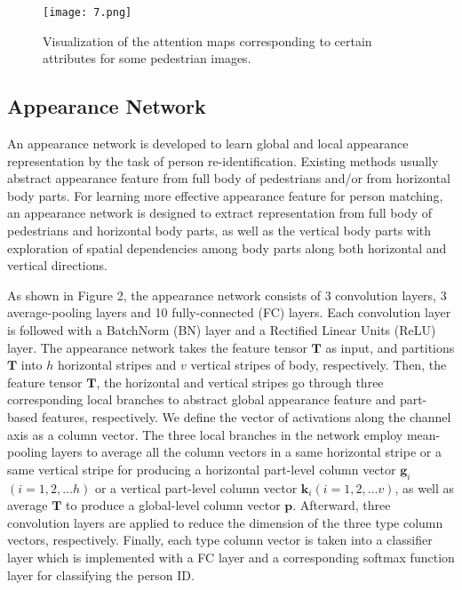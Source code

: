 \documentclass[sigconf]{acmart}
\begin{document}
\begin{figure}[htb]
	\centering
	\texttt{[image: 7.png]}
	\caption{Visualization of the attention maps corresponding to certain attributes for some pedestrian images.}
	\label{fig_overallss}
\end{figure}\subsection{Appearance Network}
An appearance network is developed to learn global and local appearance representation by the task of person re-identification.  Existing methods usually abstract appearance feature from full body of pedestrians and/or from horizontal body parts. For learning more effective appearance feature for person matching, an appearance network is designed to extract representation from full body of pedestrians and horizontal body parts, as well as the vertical body parts with exploration of spatial dependencies among body parts along both horizontal and vertical directions.

As shown in Figure 2, the appearance network consists of 3 convolution layers, 3 average-pooling layers and 10 fully-connected (FC) layers. Each convolution layer is followed with a BatchNorm (BN) layer and a Rectified Linear Units (ReLU) layer. The appearance network takes the feature tensor $\boldsymbol{T}$ as input, and partitions $\boldsymbol{T}$ into $h$ horizontal stripes and $v$ vertical stripes of body, respectively. Then, the feature tensor $\boldsymbol{T}$, the horizontal and vertical stripes go through three corresponding local branches to abstract global appearance feature and part-based features, respectively. We define the vector of activations along the channel axis as a column vector. The three local branches in the network employ mean-pooling layers to average all the column vectors in a same horizontal stripe or a same vertical stripe for producing a horizontal part-level column vector $\boldsymbol{g}_i$$(i=1,2,...h)$ or a vertical part-level column vector $\boldsymbol{k}_i$$(i=1,2,...v)$, as well as average $\boldsymbol{T}$ to produce a global-level column vector $\boldsymbol{p}$. Afterward, three convolution layers are applied to reduce the dimension of the three type column vectors, respectively. Finally, each type column vector is taken into a classifier layer which is implemented with a FC layer and a corresponding softmax function layer for classifying the person ID.
\end{document}
